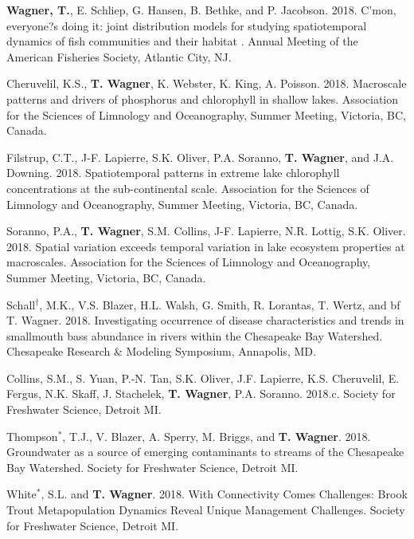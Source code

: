 \documentclass[10pt]{article}
\begin{document}
\begin{flushleft}
\begin{etaremune}
\item {\bf Wagner, T.}, E. Schliep, G. Hansen, B. Bethke, and P. Jacobson. 2018. C'mon, everyone?s doing it: joint distribution models for studying spatiotemporal dynamics of fish communities and their habitat . Annual Meeting of the American Fisheries Society, Atlantic City, NJ.

\item Cheruvelil, K.S., {\bf T. Wagner}, K. Webster, K. King, A. Poisson. 2018. Macroscale patterns and drivers of phosphorus and chlorophyll in shallow lakes. Association for the Sciences of Limnology and Oceanography, Summer Meeting, Victoria, BC, Canada.

\item Filstrup, C.T., J-F. Lapierre, S.K. Oliver, P.A. Soranno, {\bf T. Wagner}, and J.A. Downing. 2018. Spatiotemporal patterns in extreme lake chlorophyll concentrations at the sub-continental scale. Association for the Sciences of Limnology and Oceanography, Summer Meeting, Victoria, BC, Canada.

\item Soranno, P.A., {\bf T. Wagner}, S.M. Collins, J-F. Lapierre, N.R. Lottig, S.K. Oliver. 2018. Spatial variation exceeds temporal variation in lake ecosystem properties at macroscales. Association for the Sciences of Limnology and Oceanography, Summer Meeting, Victoria, BC, Canada.

\item Schall$^\dagger$, M.K., V.S. Blazer, H.L. Walsh, G. Smith, R. Lorantas, T. Wertz, and {bf T. Wagner}. 2018. Investigating occurrence of disease characteristics and trends in smallmouth bass abundance in rivers within the Chesapeake Bay Watershed. Chesapeake Research \& Modeling Symposium, Annapolis, MD.

\item Collins, S.M., S. Yuan, P.-N. Tan, S.K. Oliver, J.F. Lapierre, K.S. Cheruvelil, E. Fergus, N.K. Skaff, J. Stachelek, {\bf T. Wagner}, P.A. Soranno. 2018.c. Society for Freshwater Science, Detroit MI.

\item Thompson$^*$, T.J., V. Blazer, A. Sperry, M. Briggs, and {\bf T. Wagner}. 2018. Groundwater as a source of emerging contaminants to streams of the Chesapeake Bay Watershed. Society for Freshwater Science, Detroit MI.

\item White$^*$, S.L. and {\bf T. Wagner}. 2018. With Connectivity Comes Challenges: Brook Trout Metapopulation Dynamics Reveal Unique Management Challenges. Society for Freshwater Science, Detroit MI.


\end{etaremune}
\end{flushleft}
\end{document}
